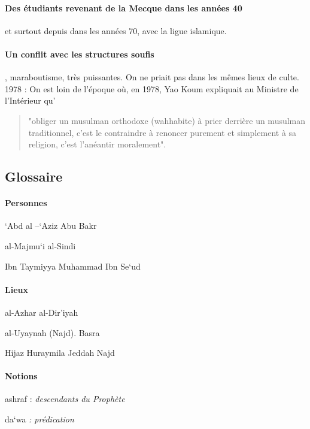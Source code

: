 \paragraph{Des étudiants revenant de la Mecque dans les années 40} et surtout depuis dans les années 70, avec la ligue islamique. 

\paragraph{Un conflit avec les structures soufis}, maraboutisme, très puissantes. On ne priait pas dans les mêmes lieux de culte. 1978 : On  est  loin de  l'époque  où,  en  1978,  Yao  Koum  expliquait  au  Ministre  de  l'Intérieur  qu' 
\begin{quote}
    "obliger  un musulman  orthodoxe (wahhabite)  à  prier  derrière  un  musulman  traditionnel,  c'est  le  contraindre  à renoncer  purement  et  simplement  à  sa  religion,  c'est  l'anéantir  moralement".
\end{quote}


\subsection{ {Glossaire}} 


\paragraph{Personnes} `Abd al --`Aziz Abu Bakr

al-Majmu`i al-Sindi

Ibn Taymiyya Muhammad Ibn Se`ud

\paragraph{Lieux}

al-Azhar al-Dir'iyah

al-Uyaynah (Najd). Basra

Hijaz Huraymila Jeddah Najd

\paragraph{Notions}

ashraf : \emph{descendants du Prophète}

da`wa \emph{: prédication}

